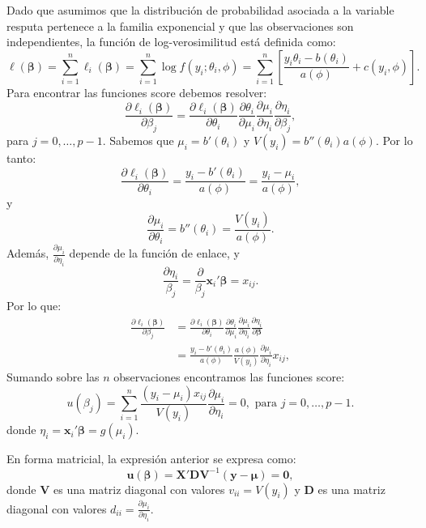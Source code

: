 \documentclass[
]{article}
\begin{document}
Dado que asumimos que la distribución de probabilidad asociada a la variable resputa pertenece a la familia exponencial y que las observaciones son independientes, la función de log-verosimilitud está definida como:
\[
\ell(\boldsymbol \beta)=\sum_{i=1}^{n}\ell_{i}(\boldsymbol \beta)=\sum_{i=1}^{n}\log f(y_{i};\theta_{i},\phi)=\sum_{i=1}^{n}\left[\frac{y_{i}\theta_{i}-b(\theta_{i})}{a(\phi)}+c(y_{i},\phi)\right].
\]
Para encontrar las funciones score debemos resolver:
\[
\frac{\partial \ell_{i}(\boldsymbol \beta)}{\partial \beta_j} = \frac{\partial \ell_{i}(\boldsymbol \beta)}{\partial \theta_{i}} \frac{\partial \theta_{i}}{\partial \mu_{i}} \frac{\partial \mu_{i}}{\partial \eta_{i}} \frac{\partial \eta_{i}}{\partial \beta_j},
\]
para \(j=0,\ldots,p-1\). Sabemos que \(\mu_{i} = b'(\theta_{i})\) y \(V(y_{i})=b''(\theta_{i})a(\phi)\). Por lo tanto:
\[
\frac{\partial \ell_{i}(\boldsymbol \beta)}{\partial \theta_{i}} = \frac{y_{i} - b'(\theta_{i})}{a(\phi)} = \frac{y_{i} - \mu_{i}}{a(\phi)},
\]
y
\[
\frac{\partial \mu_{i}}{\partial \theta_{i}} = b''(\theta_{i}) = \frac{V(y_{i})}{a(\phi)}.
\]
Además, \(\frac{\partial \mu_{i}}{\partial \eta_{i}}\) depende de la función de enlace, y
\[
\frac{\partial \eta_{i}}{\beta_{j}} = \frac{\partial}{\beta_{j}} \boldsymbol x_{i}'\boldsymbol \beta= x_{ij}.
\]
Por lo que:
\[
\begin{split}
\frac{\partial \ell_{i}(\boldsymbol \beta)}{\partial \beta_j} &= \frac{\partial \ell_{i}(\boldsymbol \beta)}{\partial \theta_{i}} \frac{\partial \theta_{i}}{\partial \mu_{i}} \frac{\partial \mu_{i}}{\partial \eta_{i}} \frac{\partial \eta_{i}}{\partial \boldsymbol \beta} \\
&= \frac{y_{i} - b'(\theta_{i})}{a(\phi)} \frac{a(\phi)}{V(y_{i})}\frac{\partial \mu_{i}}{\partial \eta_{i}} x_{ij},
\end{split}
\]
Sumando sobre las \(n\) observaciones encontramos las funciones score:
\[
u(\beta_{j}) = \sum_{i=1}^{n} \frac{(y_{i}- \mu_{i})x_{ij}}{V(y_{i})}\frac{\partial \mu_{i}}{\partial \eta_{i}} = 0, \mbox{ para }j=0,\ldots,p-1.
\]
donde \(\eta_{i} = \boldsymbol x_{i}'\boldsymbol \beta= g(\mu_{i})\).

En forma matricial, la expresión anterior se expresa como:
\[
\boldsymbol u(\boldsymbol \beta) = \boldsymbol X'\boldsymbol D\boldsymbol V^{-1}(\boldsymbol y- \boldsymbol \mu) = \boldsymbol 0,
\]
donde \(\boldsymbol V\) es una matriz diagonal con valores \(v_{ii} = V(y_{i})\) y \(\boldsymbol D\) es una matriz diagonal con valores \(d_{ii} = \frac{\partial \mu_{i}}{\partial \eta_{i}}\).
\end{document}
